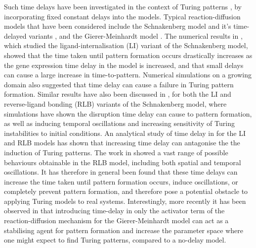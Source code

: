 Such time delays have been investigated in the context of Turing patterns \cite{gaffmonk,leegaffney,yigaffneyli,jiang,leegaffmonk,bratsun,william}, by incorporating fixed constant delays into the models. Typical reaction-diffusion models that have been considered include the Schnakenberg model and it's time-delayed variants \cite{schnakenberg}, and the Gierer-Meinhardt model \cite{gm}. The numerical results in \cite{gaffmonk}, which studied the ligand-internalisation (LI) variant of the Schnakenberg model, showed that the time taken until pattern formation occurs drastically increases as the gene expression time delay in the model is increased, and that small delays can cause a large increase in time-to-pattern. Numerical simulations on a growing domain also suggested that time delay can cause a failure in Turing pattern formation. Similar results have also been discussed in \cite{leegaffney,leegaffmonk}, for both the LI and reverse-ligand bonding (RLB) variants of the Schnakenberg model, where simulations have shown the disruption time delay can cause to pattern formation, as well as inducing temporal oscillations and increasing sensitivity of Turing instabilities to initial conditions. An analytical study of time delay in \cite{yigaffneyli} for the LI and RLB models has shown that increasing time delay can antagonise the the induction of Turing patterns. The work in \cite{jiang} showed a vast range of possible behaviours obtainable in the RLB model, including both spatial and temporal oscillations. It has therefore in general been found that these time delays can increase the time taken until pattern formation occurs, induce oscillations, or completely prevent pattern formation, and therefore pose a potential obstacle to applying Turing models to real systems. Interestingly, more recently it has been observed in \cite{fadai} that introducing time-delay in only the activator term of the reaction-diffusion mechanism for the Gierer-Meinhardt model can act as a stabilising agent for pattern formation and increase the parameter space where one might expect to find Turing patterns, compared to a no-delay model.
\\\\
